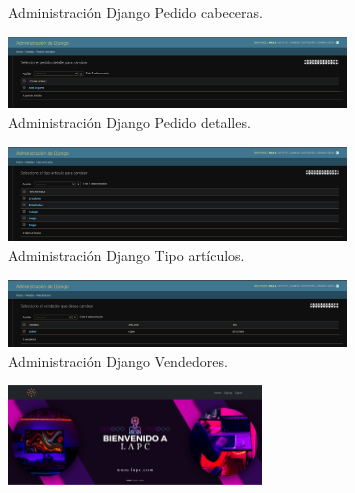 \documentclass{article}
\begin{document}
\begin{itemize}
\begin{itemize}
\begin{figure}[H]
		      \caption{Administración Django Pedido cabeceras.}
	   \end{figure}
            \begin{figure}[H]
		      \centering
                \includegraphics[width=0.8\textwidth,keepaspectratio]{img/V15.jpeg}
		      \caption{Administración Django Pedido detalles.}
	   \end{figure}
            \begin{figure}[H]
		      \centering
                \includegraphics[width=0.8\textwidth,keepaspectratio]{img/V16.jpeg}
		      \caption{Administración Django Tipo artículos.}
	   \end{figure}
            \begin{figure}[H]
		      \centering
                \includegraphics[width=0.8\textwidth,keepaspectratio]{img/V17.jpeg}
		      \caption{Administración Django Vendedores.}
	   \end{figure}
    \begin{figure}[H]
		      \centering
                \includegraphics[width=0.6\textwidth,keepaspectratio]{img/Home.png}

\end{figure}
\end{itemize}
\end{itemize}
\end{document}
